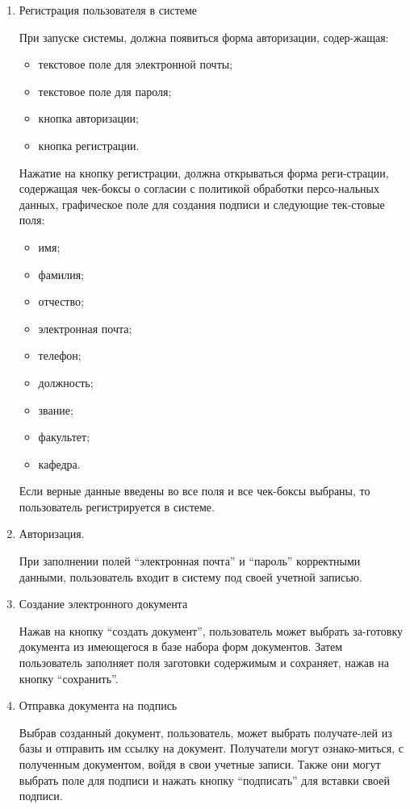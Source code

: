 \documentclass[14pt]{extarticle}        %
\begin{document}
\begin{enumerate} 
    \item Регистрация пользователя в системе\par\parindent=1cm
    При запуске системы, должна появиться форма авторизации, содер-жащая:
    \begin{itemize}
        \item текстовое поле для электронной почты;
        \item текстовое поле для пароля;
        \item кнопка авторизации;
        \item кнопка регистрации.
    \end{itemize}\par\parindent=1cm
    Нажатие на кнопку регистрации, должна открываться форма реги-страции, содержащая чек-боксы о согласии с политикой обработки персо-нальных данных, графическое поле для создания подписи и следующие тек-стовые поля:
    \begin{itemize}
        \item имя;
        \item фамилия;
        \item отчество;
        \item электронная почта;
        \item телефон;
        \item должность;
        \item звание;
        \item факультет;
        \item кафедра.
    \end{itemize}\par\parindent=1cm
    Если верные данные введены во все поля и все чек-боксы выбраны, то пользователь регистрируется в системе.
    
    \item Авторизация.\par\parindent=1cm
    При заполнении полей “электронная почта” и “пароль” корректными данными, пользователь входит в систему под своей учетной записью.
    
    \item Создание электронного документа\par\parindent=1cm
    Нажав на кнопку “создать документ”, пользователь может выбрать за-готовку документа из имеющегося в базе набора форм документов. Затем пользователь заполняет поля заготовки содержимым и сохраняет, нажав на кнопку “сохранить”.
    
    \item Отправка документа на подпись\par\parindent=1cm
    Выбрав созданный документ, пользователь, может выбрать получате-лей из базы и отправить им ссылку на документ. Получатели могут ознако-миться, с полученным документом, войдя в свои учетные записи. Также они могут выбрать поле для подписи и нажать кнопку “подписать” для вставки своей подписи.
\end{enumerate}
\end{document}
